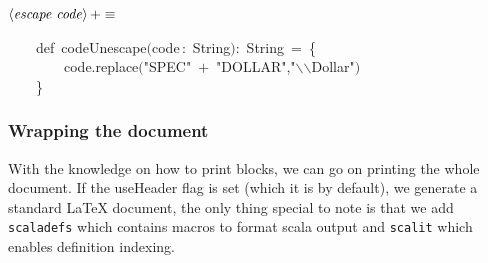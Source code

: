 \documentclass[a4paper,12pt]{article}
\begin{document}
$\left<\mbox{\emph{escape code}}\right>+\equiv$
\begin{program}~~~~{\vem def}~codeUnescape$($code\,{\rm :}~String$)${\rm :}~String~=~{\small\{}
\\~~~~~~~~code.replace$($"SPEC"~$+$~"DOLLAR","$\backslash$$\backslash$Dollar"$)$
\\~~~~{\small\}}
\\[0.5em]\end{program}
\subsubsection{Wrapping the document}
With the knowledge on how to print blocks, we can go on printing the
whole document. If the useHeader flag is set (which it is by default),
we generate a standard LaTeX document, the only thing
special to note is that we add \texttt{scaladefs} which contains macros to
format scala output and \texttt{scalit} which enables definition indexing.
\end{document}
